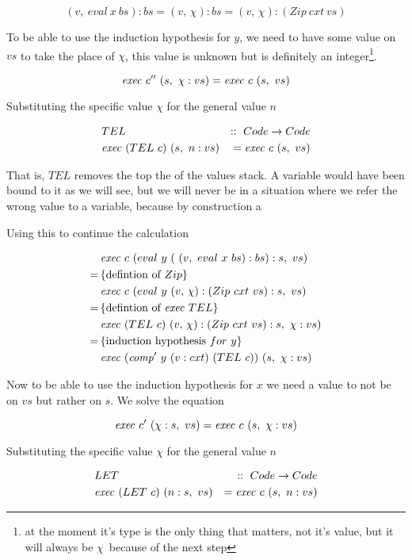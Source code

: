 \documentclass {article}
\begin{document}
\[ (v,\ eval\ x\ bs) :bs = (v,\, \chi):bs = (v,\, \chi):(Zip\ cxt\ vs) \]

To be able to use the induction hypothesis for $y$,
we need to have some value on $vs$ to take the place of $\chi$,
this value is unknown but is definitely an integer\footnote{
at the moment it's
type is the only thing that matters, not it's value,
but it will always be $\chi$\ because of the next step}.

\[ \Exec c''\ (s,\ \chi : vs) = \Exec c\ (s,\ vs) \]

Substituting the specific value $\chi$ for the general value $n$

\begin{eqnarray*}
&TEL\ &::\ Code \rightarrow Code \\
&\mathit{exec\ } (TEL\ c)\ (s,\ n:vs) &= \mathit{exec\ } c\ (s,\ vs)
\end{eqnarray*}

That is, $TEL$ removes the top the of the values stack.
A variable would have been bound to it as we will see,
but we will never be in a situation where we refer the wrong
value to a variable, because by construction a 

Using this to continue the calculation

\begin{align*}
&\mathit{exec\ } c\ (eval\ y\ (\ (v,\ eval\ x\ bs) :bs) : s,\ vs) \\
=\, & \{ \mbox{defintion of}\ Zip \} \\
&\mathit{exec\ } c\ (eval\ y\ (v,\, \chi):(Zip\ cxt\ vs) : s,\ vs) \\
=\, & \{ \mbox{defintion of}\ \mathit{exec\ } TEL\} \\
&\mathit{exec\ } (TEL\ c)\ (v,\, \chi):(Zip\ cxt\ vs) : s,\ \chi : vs) \\
=\, & \{ \mbox{induction hypothesis}\ for\ y \} \\
&\mathit{exec\ } (\mathit{comp'\ }  y\ (v:cxt)\ (TEL\ c))\ (s,\ \chi : vs)
\end{align*}

Now to be able to use the induction hypothesis for $x$
we need a value to not be on $vs$ but rather on $s$.
We solve the equation 

\[ \Exec c'\ (\chi : s,\ vs) = \Exec c\ (s,\ \chi : vs) \]

Substituting the specific value $\chi$ for the general value $n$

\begin{eqnarray*}
 	&LET\ &::\ Code \rightarrow Code \\
 	&\mathit{exec\ } (LET\ c)\ (n:s,\ vs) &= \mathit{exec\ } c\ (s,\ n:vs)
\end{eqnarray*}
\end{document}
